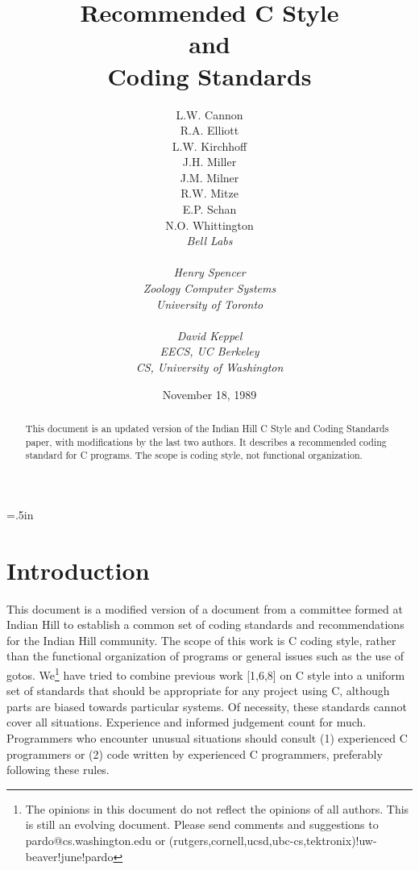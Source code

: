 \setlength{\parskip}{.1in}
\title{\Huge\bf Recommended C Style\\
and\\
Coding Standards}
\author{L.W. Cannon\\
R.A. Elliott\\
L.W. Kirchhoff\\
J.H. Miller\\
J.M. Milner\\
R.W. Mitze\\
E.P. Schan\\
N.O. Whittington\\
\it Bell Labs\\
\\
Henry Spencer\\
\it Zoology Computer Systems\\
\it University of Toronto\\
\\
David Keppel\\
\it EECS, UC Berkeley\\
\it CS, University of Washington}
\date{November 18, 1989}

\hoffset=.5in
\maketitle
\begin{abstract}
 This document is an updated version of the Indian Hill C Style and Coding 
Standards paper, with modifications by the last two authors. It describes a 
recommended coding standard for C programs. The scope is coding style, not 
functional organization. 
\end{abstract}
\pagestyle{headings}
\tableofcontents
\newpage
{}
\section{Introduction}
 This document is a modified version of a document from a committee formed at
Indian Hill to establish a common set of coding standards and recommendations
for the Indian Hill community. The scope of this work is C coding style, rather
than the functional organization of programs or general issues such as the use
of gotos. We\footnote{The opinions in this document do not reflect the opinions
of all authors.  This is still an evolving document.  Please send comments and
suggestions to pardo@cs.washington.edu or
(rutgers,cornell,ucsd,ubc-cs,tektronix)!uw-beaver!june!pardo}
  have tried to combine previous work [1,6,8] on C style into a
uniform set of standards that should be appropriate for any project using C,
although parts are biased towards particular systems. Of necessity, these
standards cannot cover all situations. Experience and informed judgement count
for much. Programmers who encounter unusual situations should consult (1)
experienced C programmers or (2) code written by experienced C programmers,
preferably following these rules. 


